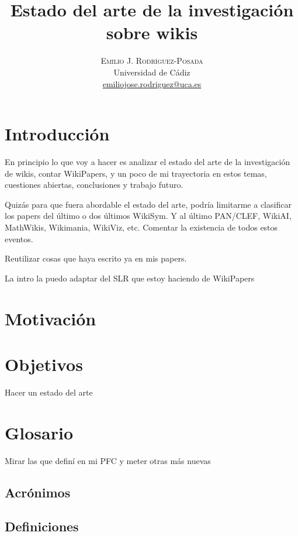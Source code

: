 \documentclass[11pt,onecolumn]{article}
\title{\vspace{-15mm}%
	\fontsize{24pt}{10pt}\selectfont
	\textbf{Estado del arte de la investigación sobre wikis}
	}
\author{%
	\large
	\textsc{Emilio J. Rodríguez-Posada} \\
	\normalsize	Universidad de Cádiz \\
	\normalsize	\href{mailto:emiliojose.rodriguez@uca.es}{emiliojose.rodriguez@uca.es}
	\vspace{-5mm}
	}
\date{}
\begin{document}
\maketitle

\begin{abstract}

\end{abstract}

\section{Introducción}

En principio lo que voy a hacer es analizar el estado del arte de la investigación de wikis, contar WikiPapers, y un poco de mi trayectoria en estos temas, cuestiones abiertas, conclusiones y trabajo futuro.

Quizás para que fuera abordable el estado del arte, podría limitarme a clasificar los papers del último o dos últimos WikiSym. Y al último PAN/CLEF, WikiAI, MathWikis, Wikimania, WikiViz, etc. Comentar la existencia de todos estos eventos.

Reutilizar cosas que haya escrito ya en mis papers.

La intro la puedo adaptar del SLR que estoy haciendo de WikiPapers

\section{Motivación}

\section{Objetivos}

Hacer un estado del arte


\section{Glosario}

Mirar las que definí en mi PFC y meter otras más nuevas

\subsection{Acrónimos}

\subsection{Definiciones}
\end{document}
